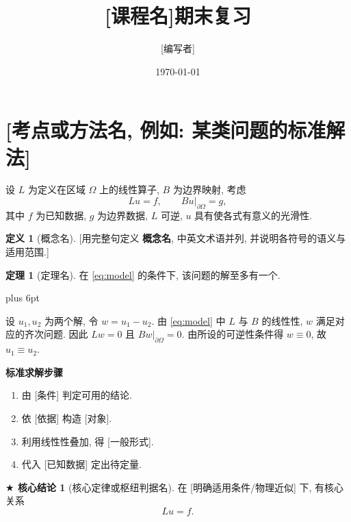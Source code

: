 \documentclass[11pt,a4paper]{article}
\title{\Huge\bfseries\color{primary} [课程名]期末复习}
\author{[编写者]}
\date{\today}
\makeatletter
\theoremstyle{definition}
\newtheorem{definition}{定义}[section]
\newtheorem{theorem}[theorem]{定理}
\newtheorem{keyconclusion}[keyconclusion]{$\bigstar$ 核心结论}
\theoremstyle{remark}
\renewenvironment{proof}[1][\proofname]{\par
  \pushQED{\qed}%
  \normalfont \topsep=6pt plus 6pt\relax
  \trivlist
  \item[\hskip\labelsep\bfseries\color{primary}#1\@addpunct{.}]\ignorespaces
}{%
  \popQED\endtrivlist\@endpefalse
}
\renewcommand{\proofname}{证明}
\numberwithin{equation}{section}
\newcommand{\takeaway}[2]{%
  \vspace{6pt}\noindent\colorbox{boxbg}{%
    \parbox{\dimexpr\textwidth-2\fboxsep\relax}{%
      \vspace{4pt}\textbf{\color{primary}#1:}\hspace{0.5em}#2\vspace{4pt}%
    }%
  }\vspace{6pt}%
}
\newcommand{\examtip}[2]{%
  \vspace{6pt}\noindent\colorbox{tipbg}{%
    \parbox{\dimexpr\textwidth-2\fboxsep\relax}{%
      \vspace{4pt}\textbf{\color{secondary}#1:}\hspace{0.5em}#2\vspace{4pt}%
    }%
  }\vspace{6pt}%
}
\makeatother
\begin{document}
\maketitle
\tableofcontents
\newpage

\section{[考点或方法名, 例如: 某类问题的标准解法]}

设 $L$ 为定义在区域 $\Omega$ 上的线性算子, $B$ 为边界映射, 考虑
\begin{equation}\label{eq:model}
L u = f, \qquad B u\big|_{\partial\Omega} = g,
\end{equation}
其中 $f$ 为已知数据, $g$ 为边界数据, $L$ 可逆, $u$ 具有使各式有意义的光滑性.

\begin{definition}[概念名]
[用完整句定义 \textbf{概念名}, 中英文术语并列, 并说明各符号的语义与适用范围.]
\end{definition}

\begin{theorem}[定理名]
\label{thm:unique}
在 \cref{eq:model} 的条件下, 该问题的解至多有一个.
\end{theorem}
\begin{proof}
设 $u_1, u_2$ 为两个解, 令 $w = u_1 - u_2$. 由 \cref{eq:model} 中 $L$ 与 $B$ 的线性性, $w$ 满足对应的齐次问题. 因此 $L w = 0$ 且 $B w|_{\partial\Omega} = 0$. 由所设的可逆性条件得 $w \equiv 0$, 故 $u_1 \equiv u_2$.
\end{proof}

\textbf{标准求解步骤}
\begin{enumerate}
    \item 由 [条件] 判定可用的结论.
    \item 依 [依据] 构造 [对象].
    \item 利用线性性叠加, 得 [一般形式].
    \item 代入 [已知数据] 定出待定量.
\end{enumerate}

\begin{keyconclusion}[核心定律或枢纽判据名]
\label{key:core}
在 [明确适用条件/物理近似] 下, 有核心关系
\begin{equation}\label{eq:core}
\boxed{L u = f.}
\end{equation}
\end{keyconclusion}
\end{document}
